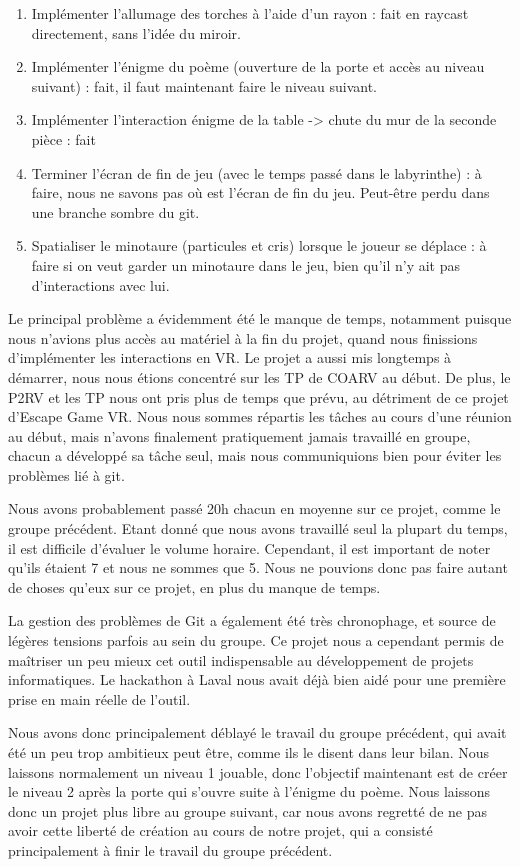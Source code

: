 \documentclass[12pt]{article}
\begin{document}
\begin{enumerate}
    \item Implémenter l'allumage des torches à l'aide d'un rayon : fait en raycast directement, sans l'idée du miroir.
    \item Implémenter l'énigme du poème (ouverture de la porte et accès au niveau suivant) : fait, il faut maintenant faire le niveau suivant.
    \item Implémenter l’interaction énigme de la table -> chute du mur de la seconde pièce : fait
    \item Terminer l’écran de fin de jeu (avec le temps passé dans le labyrinthe) : à faire, nous ne savons pas où est l’écran de fin du jeu. Peut-être perdu dans une branche sombre du git.
    \item Spatialiser le minotaure (particules et cris) lorsque le joueur se déplace : à faire si on veut garder un minotaure dans le jeu, bien qu’il n’y ait pas d’interactions avec lui.
\end{enumerate}

Le principal problème a évidemment été le manque de temps, notamment puisque nous n’avions plus accès au matériel à la fin du projet, quand nous finissions d’implémenter les interactions en VR. Le projet a aussi mis longtemps à démarrer, nous nous étions concentré sur les TP de COARV au début. De plus, le P2RV et les TP nous ont pris plus de temps que prévu, au détriment de ce projet d’Escape Game VR. Nous nous sommes répartis les tâches au cours d’une réunion au début, mais n’avons finalement pratiquement jamais travaillé en groupe, chacun a développé sa tâche seul, mais nous communiquions bien pour éviter les problèmes lié à git.

Nous avons probablement passé 20h chacun en moyenne sur ce projet, comme le groupe précédent. Etant donné que nous avons travaillé seul la plupart du temps, il est difficile d’évaluer le volume horaire. Cependant, il est important de noter qu’ils étaient 7 et nous ne sommes que 5. Nous ne pouvions donc pas faire autant de choses qu’eux sur ce projet, en plus du manque de temps.

La gestion des problèmes de Git a également été très chronophage, et source de légères tensions parfois au sein du groupe. Ce projet nous a cependant permis de maîtriser un peu mieux cet outil indispensable au développement de projets informatiques. Le hackathon à Laval nous avait déjà bien aidé pour une première prise en main réelle de l’outil.

Nous avons donc principalement déblayé le travail du groupe précédent, qui avait été un peu trop ambitieux peut être, comme ils le disent dans leur bilan. Nous laissons normalement un niveau 1 jouable, donc l’objectif maintenant est de créer le niveau 2 après la porte qui s’ouvre suite à l’énigme du poème. Nous laissons donc un projet plus libre au groupe suivant, car nous avons regretté de ne pas avoir cette liberté de création au cours de notre projet, qui a consisté principalement à finir le travail du groupe précédent.
\end{document}
